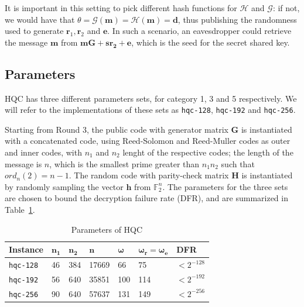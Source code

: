 It is important in this setting to pick different hash functions for $\mathcal{H}$ and $\mathcal{G}$: if not, we would have that $\theta = \mathcal{G}(\mathbf{m}) = \mathcal{H}(\mathbf{m}) = \mathbf{d}$, thus
publishing the randomness used to generate $\mathbf{r}_1, \mathbf{r}_2$ and $\mathbf{e}$. In such a scenario, an eavesdropper could retrieve
the message $\mathbf{m}$ from $\mathbf{mG + sr_2 +e}$, which is the seed for the secret shared key.

\subsection{Parameters}
HQC has three different parameters sets, for category 1, 3 and 5 respectively. We will refer to the implementations
	of these sets as \texttt{hqc-128}, \texttt{hqc-192} and \texttt{hqc-256}.

	Starting from Round 3, the public code with generator matrix $\mathbf{G}$ is instantiated with a concatenated code, using
	Reed-Solomon and Reed-Muller codes as outer and inner codes, with $n_1$ and $n_2$ lenght of the respective codes; the 
	length of the message is $n$, which is the smallest prime greater than $n_1n_2$ such that $ord_n(2) = n-1$.
	The random code with parity-check matrix $\mathbf{H}$ is instantiated by randomly sampling the vector $\mathbf{h}$
	from $\mathds{F}_2^n$.
	The parameters for the three sets are chosen to bound the decryption failure rate (DFR), and are summarized in Table~\ref{tab:parameters}.
	\begin{table}[ht]\small
		\centering
		\caption{Parameters of HQC}
		\begin{tabularx}{\textwidth}{X|X|X|X|X|X|X}
			\toprule
			\textbf{Instance} & $\mathbf{n_1}$ & $\mathbf{n_2}$ & $\mathbf{n}$ & $\mathbf{\omega}$ & $\mathbf{\omega_r = \omega_e}$ & \textbf{DFR} \\
			\midrule
			\texttt{hqc-128} & 46 & 384 & 17669 & 66 & 75 & $<2^{-128}$ \\
			\texttt{hqc-192} & 56 & 640 & 35851 & 100 & 114 & $<2^{-192}$ \\
			\texttt{hqc-256} & 90 & 640 & 57637 & 131 & 149 & $<2^{-256}$ \\
			\bottomrule
		\end{tabularx}
        \label{tab:parameters}
	\end{table}

